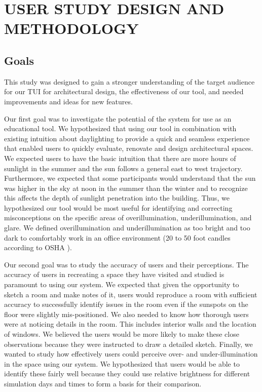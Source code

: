 \documentclass[preprint]{elsarticle}
\begin{document}
\section{USER STUDY DESIGN AND METHODOLOGY}


\subsection{Goals}
This study was designed to gain a stronger understanding of
the target audience for our TUI for architectural design, the effectiveness of our tool, and
needed improvements and ideas for new features.  

Our first goal was to investigate the potential of the system for use
as an educational tool.  We hypothesized that using our tool in
combination with existing intuition about daylighting to provide a
quick and seamless experience that enabled users to quickly evaluate,
renovate and design architectural spaces.  We expected users to have
the basic intuition that there are more hours of sunlight in the summer and the
sun follows a general east to west trajectory.  Furthermore, we
expected that some participants would understand that the sun was
higher in the sky at noon in the summer than the winter 
and to recognize this affects the depth of sunlight penetration into the building.  Thus, we
hypothesized our tool would be most useful for identifying and
correcting misconceptions on the specific areas of overillumination,
underillumination, and glare.  We defined overillumination and underillumination
as too bright and too dark to comfortably work in an office environment 
(20 to 50 foot candles according to OSHA \cite{OSHA}).  

Our second goal was to study the accuracy of users and their
perceptions.  The accuracy of users in recreating a space they have
visited and studied is paramount to using our system.  We expected
that given the opportunity to sketch a room and make notes of it,
users would reproduce a room with sufficient accuracy to successfully
identify issues in the room even if the sunspots on the floor were
slightly mis-positioned.  We also needed to know how thorough users
were at noticing details in the room.  This includes interior walls
and the location of windows.  We believed the users would be more
likely to make these close observations
because they were instructed to draw a detailed sketch.  Finally, we
wanted to study how effectively users could perceive over- and
under-illumination in the space using our system.  We hypothesized
that users would be able to identify these fairly well because they
could use relative brightness for different simulation days and times
to form a basis for their comparison.
\end{document}
